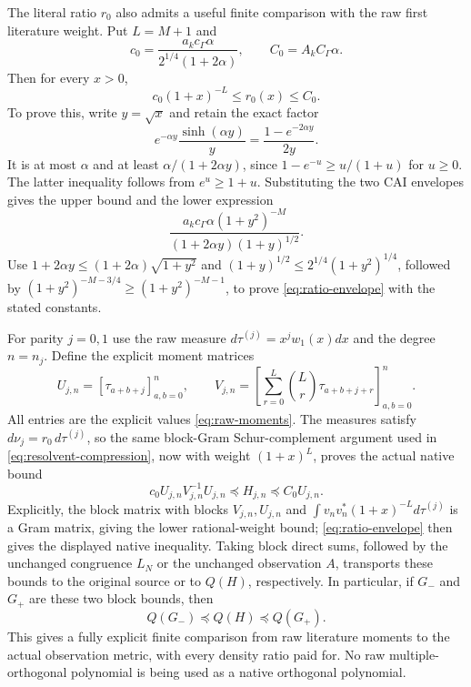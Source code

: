 \documentclass[11pt]{article}
\begin{document}
The literal ratio $r_0$ also admits a useful finite comparison
with the raw first literature weight. Put $L=M+1$ and
\begin{equation}\label{eq:ratio-constants}
 c_0=\frac{a_kc_\Gamma\alpha}{2^{1/4}(1+2\alpha)},
 \qquad C_0=A_kC_\Gamma\alpha.
\end{equation}
Then for every $x>0$,
\begin{equation}\label{eq:ratio-envelope}
 c_0(1+x)^{-L}\leq r_0(x)\leq C_0.
\end{equation}
To prove this, write $y=\sqrt x$ and retain the exact factor
\[
 e^{-\alpha y}\frac{\sinh(\alpha y)}y
    =\frac{1-e^{-2\alpha y}}{2y}.
\]
It is at most $\alpha$ and at least
$\alpha/(1+2\alpha y)$, since $1-e^{-u}\geq u/(1+u)$ for $u\geq0$.
The latter inequality follows from $e^u\geq1+u$.
Substituting the two CAI envelopes gives the upper bound and the
lower expression
\[
 \frac{a_kc_\Gamma\alpha(1+y^2)^{-M}}
                   {(1+2\alpha y)(1+y)^{1/2}}.
\]
Use $1+2\alpha y\leq(1+2\alpha)\sqrt{1+y^2}$ and
$(1+y)^{1/2}\leq2^{1/4}(1+y^2)^{1/4}$, followed by
$(1+y^2)^{-M-3/4}\geq(1+y^2)^{-M-1}$, to prove
\eqref{eq:ratio-envelope} with the stated constants.

For parity $j=0,1$ use the raw measure
$d\tau^{(j)}=x^jw_1(x)dx$ and the degree $n=n_j$. Define the
explicit moment matrices
\[
 U_{j,n}=[\tau_{a+b+j}]_{a,b=0}^n,\qquad
 V_{j,n}=\left[\sum_{r=0}^L\binom Lr\tau_{a+b+j+r}\right]_{a,b=0}^n.
\]
All entries are the explicit values \eqref{eq:raw-moments}.
The measures satisfy $d\nu_j=r_0\,d\tau^{(j)}$, so the same
block-Gram Schur-complement argument used in
\eqref{eq:resolvent-compression}, now with weight $(1+x)^L$,
proves the actual native bound
\begin{equation}\label{eq:raw-matrix-bound}
 \boxed{c_0 U_{j,n}V_{j,n}^{-1}U_{j,n}
             \preceq H_{j,n}\preceq C_0U_{j,n}.}
\end{equation}
Explicitly, the block matrix with blocks $V_{j,n},U_{j,n}$ and
$\int v_nv_n^*(1+x)^{-L}d\tau^{(j)}$ is a Gram matrix, giving
the lower rational-weight bound; \eqref{eq:ratio-envelope}
then gives the displayed native inequality.
Taking block direct sums, followed by the unchanged congruence
$L_N$ or the unchanged observation $A$, transports these bounds
to the original source or to $Q(H)$, respectively. In particular,
if $G_-$ and $G_+$ are these two block bounds, then
\[
 Q(G_-)\preceq Q(H)\preceq Q(G_+).
\]
This gives a fully explicit finite comparison from raw literature
moments to the actual observation metric, with every density
ratio paid for. No raw multiple-orthogonal polynomial is being
used as a native orthogonal polynomial.
\end{document}
